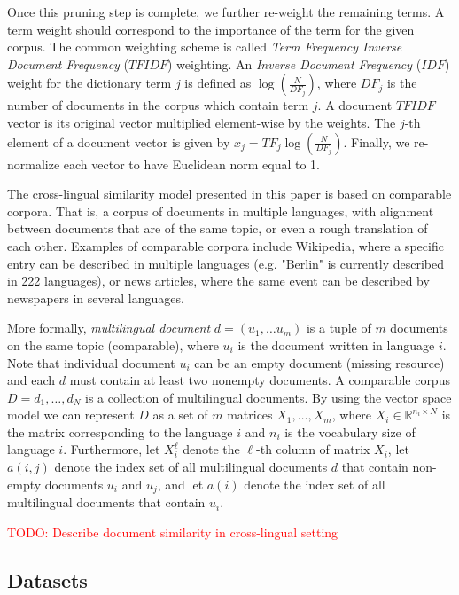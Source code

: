 \documentclass[twoside,11pt]{article}
\newcommand{\todo}[1]{\textcolor{red}{TODO: #1}}
\newcommand{\RR}{\mathbb{R}}
\begin{document}
Once this pruning step is complete, we further re-weight the remaining terms. A term weight should correspond to the importance of the term for the given corpus. The common weighting scheme is called \emph{Term Frequency Inverse Document Frequency} ($TFIDF$) weighting. An \emph{Inverse Document Frequency} ($IDF$) weight for the dictionary term $j$ is defined as $\log( \frac{N}{DF_j} )$, where $DF_j$ is the number of documents in the corpus which contain term $j$.  A document $TFIDF$ vector is its original vector multiplied element-wise by the weights. The $j$-th element of a document vector is given by $x_j = TF_j \log( \frac{N}{DF_j} )$. Finally, we re-normalize each vector to have Euclidean norm equal to 1.


The cross-lingual similarity model presented in this paper is based on comparable corpora. That is, a corpus of documents in multiple languages, with alignment between documents that are of the same topic, or even a rough translation of each other. Examples of comparable corpora include Wikipedia, where a specific entry can be described in multiple languages (e.g. "Berlin" is currently described in 222 languages), or news articles, where the same event can be described by newspapers in several languages.

More formally, \emph{multilingual document} $d = (u_1,\ldots u_m)$ is a tuple of $m$ documents on the same topic (comparable), where $u_i$ is the document written in language $i$. Note that individual document $u_i$ can be an empty document (missing resource) and each $d$ must contain at least two nonempty documents. A comparable corpus $D = {d_1, \ldots, d_N}$ is a collection of multilingual documents. By using the vector space model we can represent $D$ as a set of $m$ matrices $X_1,\ldots,X_m$, where $X_i \in \RR^{n_i \times N}$ is the matrix corresponding to the language $i$ and $n_i$ is the vocabulary size of language $i$. Furthermore, let $X_i^{\ell}$ denote the $\ell$-th column of matrix $X_i$, let $a(i,j)$ denote the index set of all multilingual documents $d$ that contain non-empty documents $u_i$ and $u_j$, and let $a(i)$ denote the index set of all multilingual documents that contain $u_i$.


\todo{Describe document similarity in cross-lingual setting} 

\subsection{Datasets}
\end{document}
